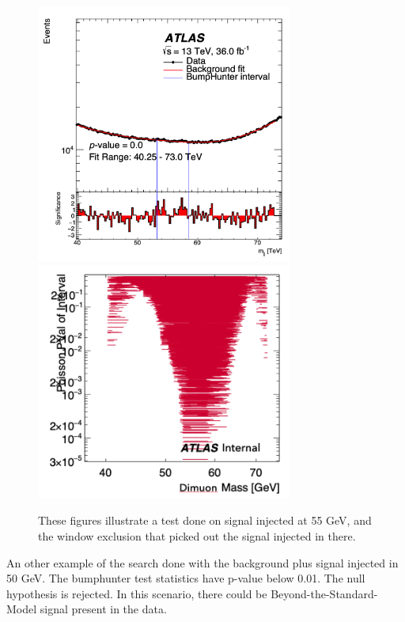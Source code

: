 \begin{figure}[!htb]
    \begin{center}
        \includegraphics[width=0.75\textwidth]{figures/chapter_dimuon/signalinjected}
        \includegraphics[width=0.75\textwidth]{figures/chapter_dimuon/signalinjected2}
        \caption{
        These figures illustrate a test done on signal injected at 55 GeV, and the window exclusion that picked out the signal injected in there.}
    \end{center}
\end{figure}

An other example of the search done with the background plus signal injected in 50 GeV. The bumphunter test statistics have p-value below 0.01. The null hypothesis is rejected. In this scenario, there could be Beyond-the-Standard-Model signal present in the data.

